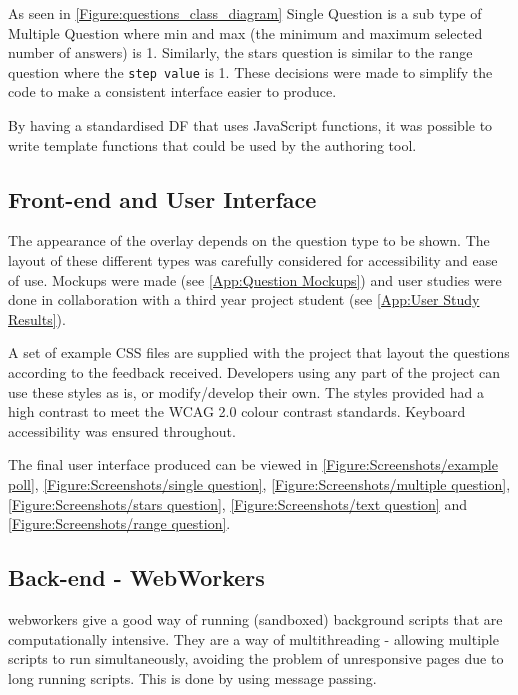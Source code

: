 As seen in \autoref{Figure:questions_class_diagram} Single Question is a sub type of Multiple Question where min and max (the minimum and maximum selected number of answers) is 1. Similarly, the stars question is similar to the range question where the \lstinline|step value| is 1. These decisions were made to simplify the code to make a consistent interface easier to produce.

By having a standardised \gls{DF} that uses JavaScript functions, it was possible to write template functions that could be used by the authoring tool.

\subsection{Front-end and User Interface}

The appearance of the overlay depends on the question type to be shown. The layout of these different types was carefully considered for accessibility and ease of use. Mockups were made (see \cref{App:Question Mockups}) and user studies were done in collaboration with a third year project student (see \cref{App:User Study Results}).

A set of example \gls{CSS} files are supplied with the project that layout the questions according to the feedback received. Developers using any part of the project can use these styles as is, or modify/develop their own. The styles provided had a high contrast to meet the \gls{WCAG} 2.0 colour contrast standards. Keyboard accessibility was ensured throughout.

The final user interface produced can be viewed in \autoref{Figure:Screenshots/example poll}, \autoref{Figure:Screenshots/single question}, \autoref{Figure:Screenshots/multiple question}, \autoref{Figure:Screenshots/stars question}, \autoref{Figure:Screenshots/text question} and \autoref{Figure:Screenshots/range question}.

\subsection{Back-end - WebWorkers}
\label{Subsection:WebWorkers}

\Glspl{webworker} give a good way of running (sandboxed) background scripts that are computationally intensive. They are a way of multithreading - allowing multiple scripts to run simultaneously, avoiding the problem of unresponsive pages due to long running scripts. This is done by using message passing.

